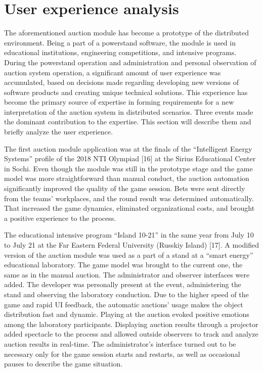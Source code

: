 \documentclass[
]{ceurart}
\begin{document}
\section{User experience analysis}
\label{sec:user-exp}

The aforementioned auction module has become a prototype of the distributed environment. Being a part of a powerstand software, the module is used in educational institutions, engineering competitions, and intensive programs. During the powerstand operation and administration and personal observation of auction system operation, a significant amount of user experience was accumulated, based on decisions made regarding developing new versions of software products and creating unique technical solutions. This experience has become the primary source of expertise in forming requirements for a new interpretation of the auction system in distributed scenarios. Three events made the dominant contribution to the expertise. This section will describe them and briefly analyze the user experience.

The first auction module application was at the finals of the “Intelligent Energy Systems” profile of the 2018 NTI Olympiad [16] at the Sirius Educational Center in Sochi. Even though the module was still in the prototype stage and the game model was more straightforward than manual conduct, the auction automation significantly improved the quality of the game session. Bets were sent directly from the teams’ workplaces, and the round result was determined automatically. That increased the game dynamics, eliminated organizational costs, and brought a positive experience to the process.

The educational intensive program ``Island 10-21'' in the same year from July 10 to July 21 at the Far Eastern Federal University (Russkiy Island) [17]. A modified version of the auction module was used as a part of a stand at a ``smart energy'' educational laboratory. The game model was brought to the current one, the same as in the manual auction. The administrator and observer interfaces were added. The developer was personally present at the event, administering the stand and observing the laboratory conduction. Due to the higher speed of the game and rapid UI feedback, the automatic auctions' usage makes the object distribution fast and dynamic. Playing at the auction evoked positive emotions among the laboratory participants. Displaying auction results through a projector added spectacle to the process and allowed outside observers to track and analyze auction results in real-time. The administrator's interface turned out to be necessary only for the game session starts and restarts, as well as occasional pauses to describe the game situation.
\end{document}
